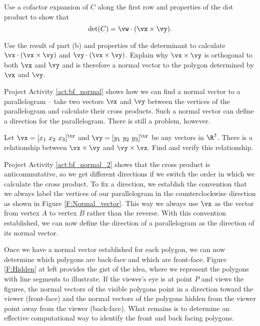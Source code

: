 \begin{pactivity}
\item  Use a cofactor expansion of $C$ along the first row and properties of the dot product to show that 
\[\det(C) = \vw \cdot (\vx \times \vy).\]


\item Use the result of part (b) and properties of the determinant to calculate $\vx \cdot (\vx \times \vy)$ and $\vy \cdot (\vx \times \vy)$. Explain why $\vx \times \vy$ is orthogonal to both $\vx$ and $\vy$ and is therefore a normal vector to the polygon determined by $\vx$ and $\vy$. 


	\ea
	
\end{pactivity}

Project Activity \ref{act:bf_normal} shows how we can find a normal vector to a parallelogram -- take two vectors $\vx$ and $\vy$ between the vertices of the parallelogram and calculate their cross products. Such a normal vector can define a direction for the parallelogram. There is still a problem, however.

\begin{pactivity} \label{act:bf_normal_2} Let $\vx = [x_1 \ x_2 \ x_3]^{\tr}$ and $\vy = [y_1 \ y_2 \ y_3]^{\tr}$ be any vectors in $\R^3$. There is a relationship between $\vx \times \vy$ and $\vy \times \vx$. Find and verify this relationship.


\end{pactivity}

Project Activity \ref{act:bf_normal_2} shows that the cross product is anticommutative, so we get different directions if we switch the order in which we calculate the cross product. To fix a direction, we establish the convention that we always label the vertices of our parallelogram in the counterclockwise direction as shown in Figure \ref{F:Normal_vector}. This way we always use $\vx$ as the vector from vertex $A$ to vertex $B$ rather than the reverse. With this convention established, we can now define the direction of a parallelogram as the direction of its normal vector.

Once we have a normal vector established for each polygon, we can now determine which polygons are back-face and which are front-face. Figure \ref{F:Hidden} at left provides the gist of the idea, where we represent the polygons with line segments to illustrate. If the viewer's eye is at point $P$ and views the figures, the normal vectors of the visible polygons point in  a direction toward the viewer (front-face) and the normal vectors of the polygons hidden from the viewer point away from the viewer (back-face). What remains is to determine an effective computational way to identify the front and back facing polygons. 

